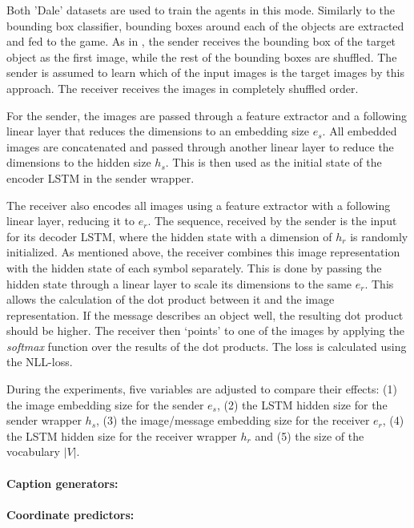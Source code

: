 Both 'Dale' datasets are used to train the agents in this mode.
Similarly to the bounding box classifier, bounding boxes around each of the objects are extracted and fed to the game.
As in \citet{Lazaridou2016}, the sender receives the bounding box of the target object as the first image, while the rest of the bounding boxes are shuffled.
The sender is assumed to learn which of the input images is the target images by this approach.
The receiver receives the images in completely shuffled order.

For the sender, the images are passed through a feature extractor and a following linear layer that reduces the dimensions to an embedding size $e_s$.
All embedded images are concatenated and passed through another linear layer to reduce the dimensions to the hidden size $h_s$.
This is then used as the initial state of the encoder LSTM in the sender wrapper.

The receiver also encodes all images using a feature extractor with a following linear layer, reducing it to $e_r$.
The sequence, received by the sender is the input for its decoder LSTM, where the hidden state with a dimension of $h_r$ is randomly initialized.
As mentioned above, the receiver combines this image representation with the hidden state of each symbol separately.
This is done by passing the hidden state through a linear layer to scale its dimensions to the same $e_r$.
This allows the calculation of the dot product between it and the image representation.
If the message describes an object well, the resulting dot product should be higher.
The receiver then `points' to one of the images by applying the \emph{softmax} function over the results of the dot products.
The loss is calculated using the NLL-loss.

During the experiments, five variables are adjusted to compare their effects:
(1) the image embedding size for the sender $e_s$, (2) the LSTM hidden size for the sender wrapper $h_s$, (3) the image/message embedding size for the receiver $e_r$, (4) the LSTM hidden size for the receiver wrapper $h_r$ and (5) the size of the vocabulary $|V|$.

\paragraph{Caption generators:}

\paragraph{Coordinate predictors:}


